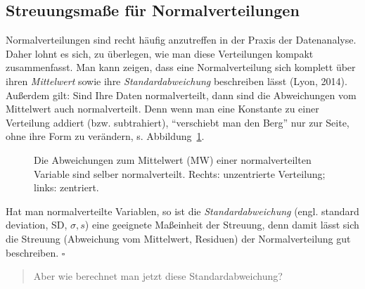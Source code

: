 \documentclass[
  letterpaper,
  twoside,
  open=any]{scrbook}
\theoremstyle{definition}
\theoremstyle{definition}
\theoremstyle{definition}
\theoremstyle{remark}
\begin{document}
\subsection{Streuungsmaße für
Normalverteilungen}\label{streuungsmauxdfe-fuxfcr-normalverteilungen}

Normalverteilungen sind recht häufig anzutreffen in der Praxis der
Datenanalyse. Daher lohnt es sich, zu überlegen, wie man diese
Verteilungen kompakt zusammenfasst. Man kann zeigen, dass eine
Normalverteilung sich komplett über ihren \emph{Mittelwert} sowie ihre
\emph{Standardabweichung} beschreiben lässt (Lyon, 2014). Außerdem gilt:
Sind Ihre Daten normalverteilt, dann sind die Abweichungen vom
Mittelwert auch normalverteilt. Denn wenn man eine Konstante zu einer
Verteilung addiert (bzw. subtrahiert), \enquote{verschiebt man den Berg}
nur zur Seite, ohne ihre Form zu verändern, s.
Abbildung~\ref{fig-norm-dev}.

\begin{figure}


\caption{\label{fig-norm-dev}Die Abweichungen zum Mittelwert (MW) einer
normalverteilten Variable sind selber normalverteilt. Rechts:
unzentrierte Verteilung; links: zentriert.}

\end{figure}%

Hat man normalverteilte Variablen, so ist die \emph{Standardabweichung}
(engl. standard deviation, SD, \(\sigma, s\)) eine geeignete Maßeinheit
der Streuung, denn damit lässt sich die Streuung (Abweichung vom
Mittelwert, Residuen) der Normalverteilung gut beschreiben. \(\square\)

\begin{quote}
{} Aber wie berechnet man jetzt diese Standardabweichung?
\end{quote}
\end{document}
